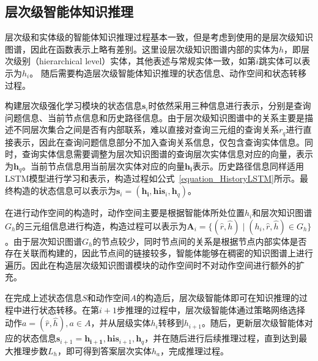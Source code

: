\documentclass[algorithmlist, AutoFakeBold, AutoFakeSlant, figurelist, tablelist, nomlist, masters]{seuthesix}
\begin{document}
\subsection{层次级智能体知识推理}
层次级和实体级的智能体知识推理过程基本一致，但是考虑到使用的是层次级知识图谱，因此在函数表示上略有差别。这里设层次级知识图谱内部的实体为$h$，即层次级别（hierarchical level）实体，其他表述与常规实体一致，如第$i$跳实体可以表示为$h_i$。
随后需要构造层次级智能体知识推理的状态信息、动作空间和状态转移过程。

构建层次级强化学习模块的状态信息$\bm{s}_i$时依然采用三种信息进行表示，分别是查询问题信息、当前节点信息和历史路径信息。由于层次级知识图谱中的关系主要是描述不同层次集合之间是否有内部联系，难以直接对查询三元组的查询关系$r_q$进行直接表示，因此在查询问题信息部分不加入查询关系信息，仅包含查询实体信息。同时，查询实体信息需要调整为层次知识图谱的查询层次实体信息对应的向量，表示为$\bm{h}_q$。当前节点信息用当前层次实体对应的向量$\bm{h_i}$表示。历史路径信息同样适用LSTM模型进行学习和表示，构造过程如公式~\ref{equation_HistoryLSTM}所示。最终构造的状态信息可以表示为$\bm{s}_i = (\bm{h_i}, \bm{his}_i, \bm{h}_q)$。

在进行动作空间的构造时，动作空间主要是根据智能体所处位置$h_i$和层次知识图谱$G_h$的三元组信息进行构造，构造过程可以表示为$\bm{A}_i = \{(\hat{r}, \hat{h}) \mid (h_i, \hat{r}, \hat{h}) \in G_h\}$。由于层次知识图谱$G_h$的节点较少，同时节点间的关系是根据节点内部实体是否存在关联而构建的，因此节点间的链接较多，智能体能够在稠密的知识图谱上进行遍历。因此在构造层次级知识图谱模块的动作空间时不对动作空间进行额外的扩充。

在完成上述状态信息$S$和动作空间$A$的构造后，层次级智能体即可在知识推理的过程中进行状态转移。在第$i+1$步推理的过程中，层次级智能体通过策略网络选择动作$a = (\hat{r}, \hat{h}), a \in A$，并从层级实体$h_i$转移到$h_{i+1}$。随后，更新层次级智能体对应的状态信息$\bm{s}_{i+1} = {\bm{h_{i+1}}, \bm{his}_{i+1}, \bm{h}_q}$，并在随后进行后续推理过程，直到达到最大推理步数$L_h$，即可得到答案层次实体$h_a$，完成推理过程。
\end{document}
